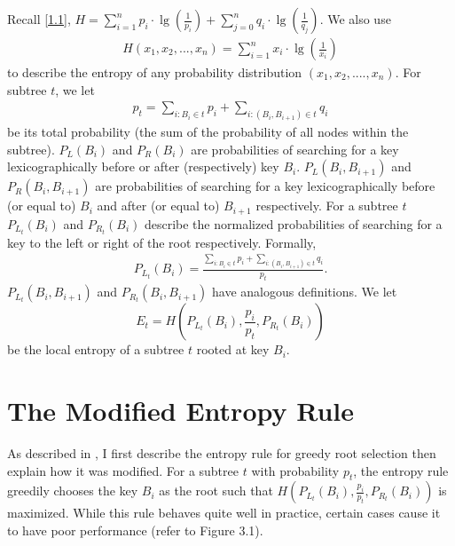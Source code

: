 \documentclass[letterpaper,12pt,titlepage,oneside,final]{book}
\theoremstyle{plain}
\begin{document}
Recall \ref{1.1}, $H = \sum_{i=1}^{n} p_i\cdot\lg(\frac{1}{p_i}) + \sum_{j=0}^{n} q_i\cdot\lg(\frac{1}{q_j})$. We also use
\begin{align*}
H(x_1,x_2,...,x_n) = \sum_{i=1}^{n} x_i\cdot\lg(\frac{1}{x_i})
\end{align*} to describe the entropy of any probability distribution $(x_1, x_2, ...., x_n)$. For subtree $t$, we let 
\begin{align*}
p_t=\sum_{i : B_i \in t} p_i + \sum_{i : (B_i, B_{i+1}) \in t} q_i
\end{align*}
 be its total probability (the sum of the probability of all nodes within the subtree). $P_{L}(B_i)$ and $P_{R}(B_i)$ are probabilities of searching for a key lexicographically before or after (respectively) key $B_i$. $P_{L}(B_i, B_{i+1})$ and $P_{R}(B_i, B_{i+1})$ are probabilities of searching for a key lexicographically before (or equal to) $B_i$ and after (or equal to) $B_{i+1}$ respectively. For a subtree  $t$ $P_{L_t}(B_i)$ and $P_{R_t}(B_i)$ describe the normalized probabilities of searching for a key to the left or right of the root respectively. Formally,
\begin{align*}
P_{L_t}(B_i) = \frac{\sum_{i : B_i \in t} p_i + \sum_{i : (B_i, B_{i+1}) \in t} q_i}{p_t}.
\end{align*}
$P_{L_t}(B_i,B_{i+1})$ and $P_{R_t}(B_i,B_{i+1})$ have analogous definitions. 
We let  
\begin{equation}
E_t=H(P_{L_t}(B_i), \frac{p_i}{p_t}, P_{R_t}(B_i))
\end{equation} be the local entropy of a subtree $t$ rooted at key $B_i$.  

\section{The Modified Entropy Rule}\label{The Modified Entropy Rule}

As described in \cite{guttler1980binary}, I first describe the entropy rule for greedy root selection then explain how it was modified. For a subtree $t$ with probability $p_t$, the entropy rule greedily chooses the key $B_i$ as the root such that $H(P_{L_t}(B_i), \frac{p_i}{p_t}, P_{R_t}(B_i))$ is maximized. While this rule behaves quite well in practice, certain cases cause it to have poor performance (refer to Figure 3.1). 
\end{document}
